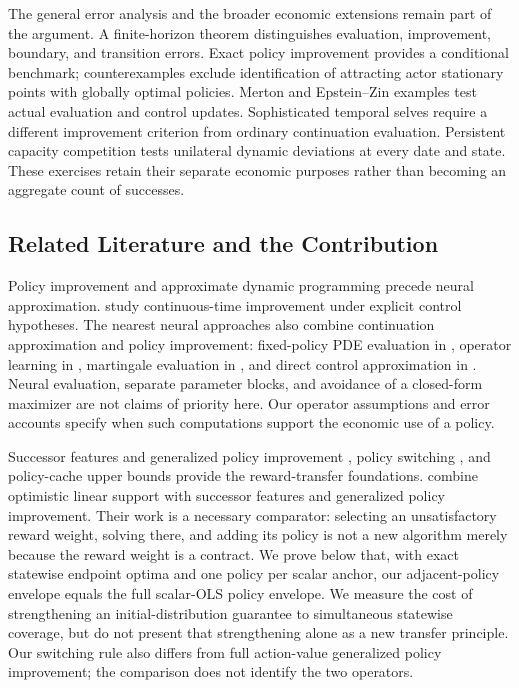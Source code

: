 The general error analysis and the broader economic extensions remain part of the argument. A finite-horizon theorem distinguishes evaluation, improvement, boundary, and transition errors. Exact policy improvement provides a conditional benchmark; counterexamples exclude identification of attracting actor stationary points with globally optimal policies. Merton and Epstein--Zin examples test actual evaluation and control updates. Sophisticated temporal selves require a different improvement criterion from ordinary continuation evaluation. Persistent capacity competition tests unilateral dynamic deviations at every date and state. These exercises retain their separate economic purposes rather than becoming an aggregate count of successes.

\subsection{Related Literature and the Contribution}
Policy improvement and approximate dynamic programming precede neural approximation. \citet{jacka2015} study continuous-time improvement under explicit control hypotheses. The nearest neural approaches also combine continuation approximation and policy improvement: fixed-policy PDE evaluation in \citet{kim2025,kim2026}, operator learning in \citet{lee2024}, martingale evaluation in \citet{cai2025}, and direct control approximation in \citet{han2016}. Neural evaluation, separate parameter blocks, and avoidance of a closed-form maximizer are not claims of priority here. Our operator assumptions and error accounts specify when such computations support the economic use of a policy.

Successor features and generalized policy improvement \citep{barreto2017}, policy switching \citep{chang2021}, and policy-cache upper bounds \citep{nemecek2021} provide the reward-transfer foundations. \citet{alegre2022} combine optimistic linear support with successor features and generalized policy improvement. Their work is a necessary comparator: selecting an unsatisfactory reward weight, solving there, and adding its policy is not a new algorithm merely because the reward weight is a contract. We prove below that, with exact statewise endpoint optima and one policy per scalar anchor, our adjacent-policy envelope equals the full scalar-OLS policy envelope. We measure the cost of strengthening an initial-distribution guarantee to simultaneous statewise coverage, but do not present that strengthening alone as a new transfer principle. Our switching rule also differs from full action-value generalized policy improvement; the comparison does not identify the two operators.

